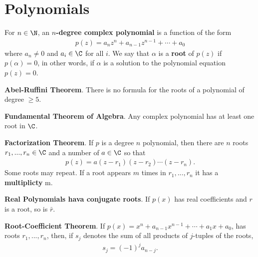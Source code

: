 \documentclass{article}
\begin{document}
\section{Polynomials}
\begin{definition}
	For $n\in\N$, an \textbf{$n$-degree complex polynomial} is a function of the form
	\begin{align*}
		p(z)=a_nz^n+a_{n-1}z^{n-1}+\cdots+a_0
	\end{align*}
	where $a_n\not=0$ and $a_i\in\C$ for all $i$. We say that $\alpha$ is a \textbf{root} of $p(z)$ if $p(\alpha)=0$, in other words, if $\alpha$ is a solution to the polynomial equation $p(z)=0$.
\end{definition}
\begin{theorem}
	\textbf{Abel-Ruffini Theorem}. There is no formula for the roots of a polynomial of degree $\geq 5$.
\end{theorem}
\begin{theorem}
	\textbf{Fundamental Theorem of Algebra}. Any complex polynomial has at least one root in $\C$.
\end{theorem}
\begin{theorem}
	\textbf{Factorization Theorem}. If $p$ is a degree $n$ polynomial, then there are $n$ roots $r_1,...,r_n\in\C$ and a number of $a\in\C$ so that
	\begin{align*}
		p(z)=a(z-r_1)(z-r_2)\cdots(z-r_n).
	\end{align*}
	Some roots may repeat. If a root appears $m$ times in $r_1, ..., r_n$ it has a \textbf{multiplicty} m.
\end{theorem}
\begin{theorem}
	\textbf{Real Polynomials hava conjugate roots}. If $p(x)$ has real coefficients and $r$ is a root, so is $\bar{r}$.
\end{theorem}
\begin{theorem}
	\textbf{Root-Coefficient Theorem}. If $p(x)=x^n+a_{n-1}x^{n-1}+\cdots+a_1x+a_0$, has roots $r_1, ..., r_n$, then, if $s_j$ denotes the sum of all products of $j$-tuples of the roots,
	\begin{align*}
		s_j=(-1)^ja_{n-j}.
	\end{align*}
\end{theorem}
\end{document}
